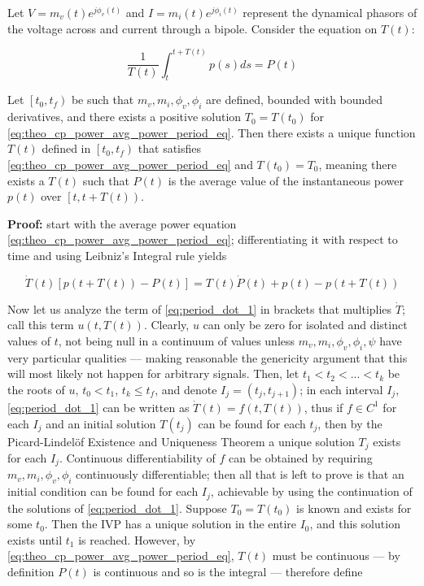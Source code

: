 \begin{theorem}\label{theo:activepowerperiod} %
	Let $V = m_v(t)e^{j\phi_v(t)}$ and $I = m_i(t)e^{j\phi_i(t)}$ represent the dynamical phasors of the voltage across and current through a bipole. Consider the equation on $T(t)$:

\begin{equation} \dfrac{1}{T(t)}\int_{t}^{t+T(t)} p(s)ds = P(t) \label{eq:theo_cp_power_avg_power_period_eq} \end{equation}

	Let $\left[t_0,t_f\right)$ be such that $m_v,m_i,\phi_v,\phi_i$ are defined, bounded with bounded derivatives, and there exists a positive solution $T_0 = T\left(t_0\right)$ for \eqref{eq:theo_cp_power_avg_power_period_eq}.	Then there exists a unique function $T(t)$ defined in $\left[t_0,t_f\right)$ that satisfies \eqref{eq:theo_cp_power_avg_power_period_eq} and $T\left(t_0\right) = T_0$, meaning there exists a $T(t)$ such that $P(t)$ is the average value of the instantaneous power $p(t)$ over $\left[t,t+T\left(t\right)\right)$.
\end{theorem}
\textbf{Proof:} start with the average power equation \eqref{eq:theo_cp_power_avg_power_period_eq}; differentiating it with respect to time and using Leibniz's Integral rule yields

\begin{equation}
\dot{T}\left(t\right)\left[p\left(t+T\left(t\right)\right) - P\left(t\right)\right] = T\left(t\right)\dot{P}\left(t\right) + p\left(t\right)- p\left(t+T\left(t\right)\right) \label{eq:period_dot_1}
\end{equation}

	Now let us analyze the term of \eqref{eq:period_dot_1} in brackets that multiplies $\dot{T}$; call this term $u\left(t,T(t)\right)$. Clearly, $u$ can only be zero for isolated and distinct values of $t$, not being null in a continuum of values unless $m_v,m_i,\phi_v,\phi_i,\psi$ have very particular qualities — making reasonable the genericity argument that this will most likely not happen for arbitrary signals. Then, let $t_1 < t_2 < ... < t_k$ be the roots of $u$, $t_0 < t_1$, $t_k \leq t_f$, and denote $I_j = \left(t_j,t_{j+1}\right)$; in each interval $I_j$, \eqref{eq:period_dot_1} can be written as $\dot{T}(t) = f\left(t,T(t)\right)$, thus if $f\in C^1$ for each $I_j$ and an initial solution $T(t_j)$ can be found for each $t_j$, then by the Picard-Lindelöf Existence and Uniqueness Theorem \cite[p. 188]{Perko2001} a unique solution $T_j$ exists for each $I_j$. Continuous differentiability of $f$ can be obtained by requiring $m_v,m_i,\phi_v,\phi_i$ continuously differentiable; then all that is left to prove is that an initial condition can be found for each $I_j$, achievable by using the continuation of the solutions of \eqref{eq:period_dot_1}. Suppose $T_0 = T\left(t_0\right)$ is known and exists for some $t_0$. Then the IVP has a unique solution in the entire $I_0$, and this solution exists until $t_1$ is reached. However, by \eqref{eq:theo_cp_power_avg_power_period_eq}, $T(t)$ must be continuous — by definition $P(t)$ is continuous and so is the integral — therefore define

